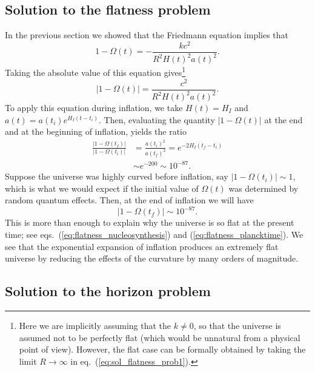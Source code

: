 \subsection{Solution to the flatness problem}

In the previous section we showed that the Friedmann equation implies that
\begin{equation}
1-\Omega(t)=-\frac{kc^2}{R^2H(t)^2a(t)^2}.
\end{equation}
Taking the absolute value of this equation gives\footnote{Here we are implicitly assuming that the $k\neq0$, so that the universe is assumed not to be perfectly flat (which would be unnatural from a physical point of view). However, the flat case can be formally obtained by taking the limit $R\to\infty$ in eq.\ (\ref{eq:sol_flatness_prob1}).}
\begin{equation} \label{eq:sol_flatness_prob1}
|1-\Omega(t)|=\frac{c^2}{R^2H(t)^2a(t)^2}.
\end{equation}
To apply this equation during inflation, we take $H(t)=H_I$ and $a(t)=a(t_i)e^{H_I(t-t_i)}$. Then, evaluating the quantity $|1-\Omega(t)|$ at the end and at the beginning of inflation, yields the ratio
\begin{equation}
\begin{split}
\frac{|1-\Omega(t_f)|}{|1-\Omega(t_i)|}&=\frac{a(t_i)^2}{a(t_f)^2}=e^{-2H_I(t_f-t_i)}\\
&\sim e^{-200}\sim 10^{-87}.
\end{split}
\end{equation}
Suppose the universe was highly curved before inflation, say $|1-\Omega(t_i)|\sim 1$, which is what we would expect if the initial value of $\Omega(t)$ was determined by random quantum effects. Then, at the end of inflation we will have
\begin{equation}
|1-\Omega(t_f)|\sim 10^{-87}.
\end{equation}
This is more than enough to explain why the universe is so flat at the present time; see eqs.\ (\ref{eq:flatness_nucleosynthesis}) and (\ref{eq:flatness_plancktime}). We see that the exponential expansion of inflation produces an extremely flat universe by reducing the effects of the curvature by many orders of magnitude.

\subsection{Solution to the horizon problem}


